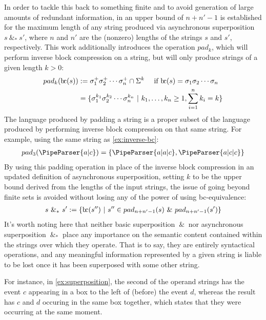 \documentclass[a4paper,12pt,leqno]{article}
\newcommand{\bc}{{\rm b\!c}}
\newcommand{\vph}[1]{\vphantom{#1}}
\newcommand{\ebox}[1]{\fbox{$\vph{'(),}#1$}}
\renewcommand{\sp}{~\&~}
\newcommand{\spasync}{~\&_*~}
\newcommand{\EventString}[1]{%
	\renewcommand*{\do}[1]{\ebox{##1}}%
	\PipeParser{#1}%
}
\begin{document}
In order to tackle this back to something finite and to avoid generation of large amounts of redundant information, in \citet[p. 127]{woods2017towards} an upper bound of $n + n' - 1$\label{def:sp-upper-bound-length} is established for the maximum length of any string produced via asynchronous superposition $s \spasync s'$, where $n$ and $n'$ are the (nonzero) lengths of the strings $s$ and $s'$, respectively. This work additionally introduces the operation $pad_k$, which will perform inverse block compression on a string, but will only produce strings of a given length $k > 0$:
\begin{align}\label{def:padk}
	pad_k(\bc(s)) &:= \sigma_1^+ \sigma_2^+ \cdots \sigma_n^+ \cap \Sigma^k ~~~ \mbox{ if } \bc(s) = \sigma_1 \sigma_2 \cdots \sigma_n\\
	&=\{\sigma_1^{k_1}\sigma_2^{k_2}\cdots\sigma_n^{k_n} ~|~ k_1,\ldots,k_n \ge 1, \sum_{i = 1}^{n}k_i = k  \}\notag
\end{align}
The language produced by padding a string is a proper subset of the language produced by performing inverse block compression on that same string. For example, using the same string as \cref{ex:inverse-bc}:
\begin{align}\label{ex:padk}
	pad_3(\EventString{a|c}) = \{\EventString{a|a|c}, \EventString{a|c|c}\}
\end{align}
By using this padding operation in place of the inverse block compression in an updated definition of asynchronous superposition, setting $k$ to be the upper bound derived from the lengths of the input strings, the issue of going beyond finite sets is avoided without losing any of the power of using \bc-equivalence:
\begin{align}\label{def:async-superposition}
	s \spasync s' := \{\bc(s'') ~|~ s'' \in pad_{n+n'-1}(s) \sp pad_{n+n'-1}(s')\}
\end{align}
It's worth noting here that neither basic superposition $\sp$ nor asynchronous superposition $\spasync$ place any importance on the semantic content contained within the strings over which they operate. That is to say, they are entirely syntactical operations, and any meaningful information represented by a given string is liable to be lost once it has been superposed with some other string.

For instance, in \cref{ex:superposition}, the second of the operand strings has the event $c$ appearing in a box to the left of (before) the event $d$, whereas the result has $c$ and $d$ occuring in the same box together, which states that they were occurring at the same moment.
\end{document}
